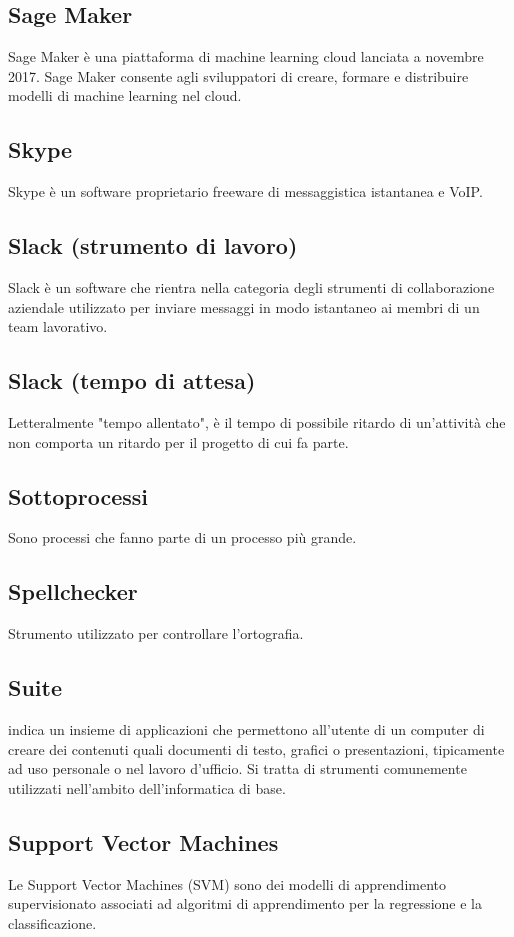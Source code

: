 
\subsection*{Sage Maker}
Sage Maker è una piattaforma di machine learning cloud lanciata a novembre 2017. Sage Maker consente agli sviluppatori di creare, formare e distribuire modelli di machine learning nel cloud.

\subsection*{Skype}
Skype è un software proprietario freeware di messaggistica istantanea e VoIP.

\subsection*{Slack (strumento di lavoro)}
Slack è un software che rientra nella categoria degli strumenti di collaborazione aziendale utilizzato per inviare messaggi in modo istantaneo ai membri di un team lavorativo.

\subsection*{Slack (tempo di attesa)}
Letteralmente "tempo allentato", è il tempo di possibile ritardo di un’attività che non comporta
un ritardo per il progetto di cui fa parte.

\subsection*{Sottoprocessi}
Sono processi che fanno parte di un processo più grande.

\subsection*{Spellchecker}
Strumento utilizzato per controllare l'ortografia.

\subsection*{Suite}
indica un insieme di applicazioni che permettono all'utente di un computer di creare dei contenuti quali documenti di testo, grafici o presentazioni, tipicamente ad uso personale o nel lavoro d'ufficio. 
Si tratta di strumenti comunemente utilizzati nell'ambito dell'informatica di base.

\subsection*{Support Vector Machines}
Le Support Vector Machines (SVM) sono dei modelli di apprendimento supervisionato associati ad algoritmi di apprendimento per la regressione e la classificazione.

